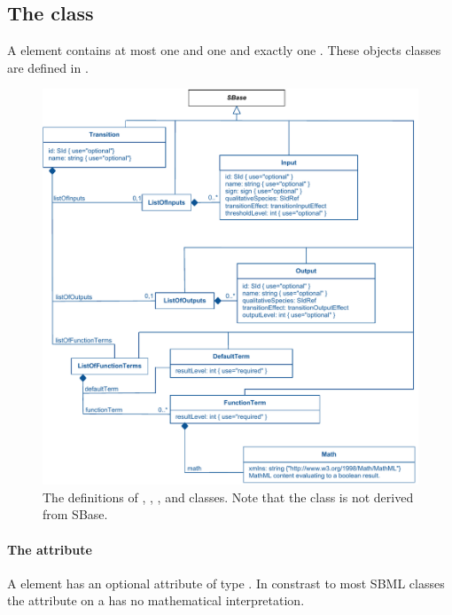 \subsection{The  class}
\label{transitions-class}
A \Transition element contains at most one \ListOfInputs and one \ListOfOutputs and exactly one \ListOfFunctionTerms. These objects classes are defined in .

\begin{figure}
  \includegraphics{figs/qual-transition-uml.pdf}
  \caption{The definitions of \Transition, \Input, \Output, \DefaultTerm and \FunctionTerm classes. Note that the \DefaultTerm class is not derived from SBase. }
  \label{qual-transition-uml}
\end{figure}

\paragraph{The  attribute}
A \Transition element has an optional  attribute of type .  In constrast to most SBML classes the  attribute on a \Transition has no mathematical interpretation.

